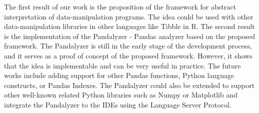 \Large
The first result of our work is the proposition of the framework for abstract interpretation of data-manipulation programs.
The idea could be used with other data-manipulation libraries in other languages like Tibble in R\@.
The second result is the implementation of the Pandalyzer - Pandas analyzer based
on the proposed framework.
The Pandalyzer is still in the early stage of the development process, and
it serves as a proof of concept of the proposed framework.
However, it shows that the idea is implementable and can be very useful in practice.
The future works include adding support for other Pandas functions, Python language constructs, or Pandas Indexes.
The Pandalyzer could also be extended to support other well-known related Python libraries such as Numpy or Matplotlib
and integrate the Pandalyzer to the IDEs using the Language Server Protocol.

